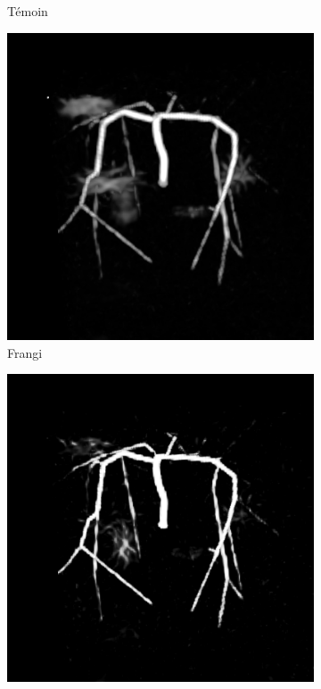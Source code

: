 \begin{figure}[!ht]
\begin{subfigure}[t]{0.32\textwidth}
    \caption{Témoin}
  \end{subfigure}
  \begin{subfigure}[t]{0.32\textwidth}
    \includegraphics[clip = true, trim = 80 80 80 80,width=\textwidth]{Images/Vascu_4_Frangi.png}  
    \caption{Frangi}
  \end{subfigure}
  \begin{subfigure}[t]{0.32\textwidth}
    \includegraphics[clip = true, trim = 80 80 80 80,width=\textwidth]{Images/Vascu_4_Jerman.png}

\end{subfigure}
\end{figure}
